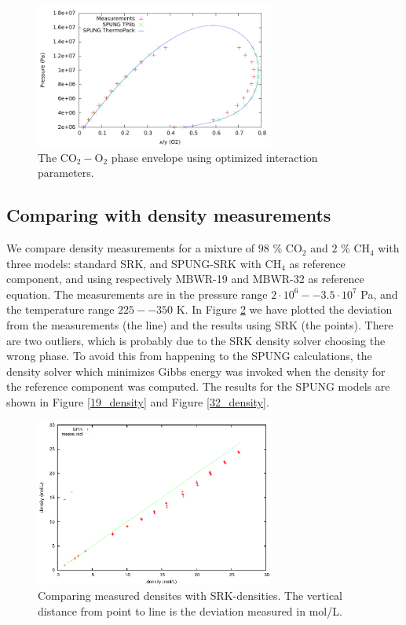 \documentclass[english]{../thermomemo/thermomemo}
\numberwithin{equation}{section}
\begin{document}
\begin{figure}[h]
  \centering
  \includegraphics[width=0.7\textwidth]{figures/phaseEnvelope_O2_optimized.pdf}
  \caption{The $\mathrm{CO}_2-\mathrm O_2$ phase envelope using
    optimized interaction parameters.}
  \label{fig:O2opt}
\end{figure}

\subsection{Comparing with density measurements}
We compare density measurements for a mixture of $98$ \% CO$_2$ and $2$ \% CH$_4$ with three models: standard SRK, and SPUNG-SRK with CH$_4$ as reference component, and using respectively MBWR-19 and MBWR-32 as reference equation. The measurements are in the pressure range $2\cdot 10^6 -- 3.5 \cdot 10^7$ Pa, and the temperature range $225--350$ K. In Figure \ref{SRK_density} we have plotted the deviation from the measurements (the line) and the results using SRK (the points). There are two outliers, which is probably due to the SRK density solver choosing the wrong phase. To avoid this from happening to the SPUNG calculations, the density solver which minimizes Gibbs energy was invoked when the density for the reference component was computed. The results for the SPUNG models are shown in Figure \ref{19_density} and Figure \ref{32_density}.

\begin{figure}[h]
  \centering
  \includegraphics[width=0.7\textwidth]{figures/SRK_density.eps}
  \caption{Comparing measured densites with SRK-densities. The vertical distance from point to line is the deviation measured in mol/L.}
  \label{SRK_density}
\end{figure}
\end{document}
